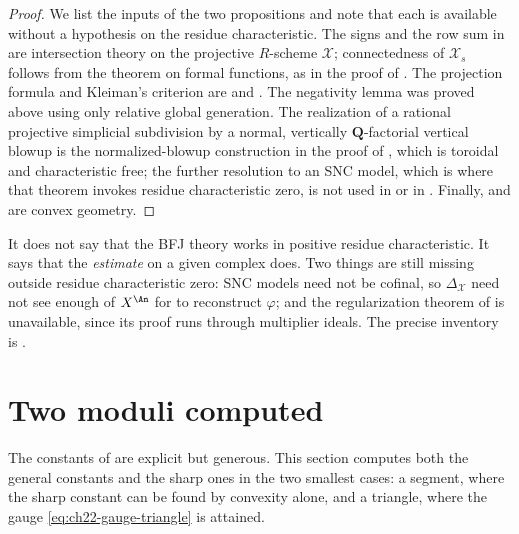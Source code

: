 \begin{proof}
We list the inputs of the two propositions and note that each is available
without a hypothesis on the residue characteristic.  The signs and the row
sum in  are intersection theory on the
projective $R$-scheme $\mathcal X$; connectedness of $\mathcal X_s$
follows from the theorem on formal functions, as in the proof of
.  The projection formula and Kleiman's criterion
are  and \cite[Section~1.4]{KM08}.  The negativity
lemma  was proved above using only relative global
generation.  The realization of a rational projective simplicial subdivision
by a normal, vertically $\mathbf Q$-factorial vertical blowup is the
normalized-blowup construction in the proof of
, which is toroidal and characteristic free;
the further resolution to an SNC model, which is where that theorem invokes
residue characteristic zero, is not used in
 or in
.  Finally,
 and  are convex geometry.
\end{proof}

\begin{remark}
\label{rem:ch22-characteristic-free-caveat}
It does not say that the BFJ theory works in positive residue
characteristic.  It says that the \emph{estimate} on a given complex does.
Two things are still missing outside residue characteristic zero: SNC models
need not be cofinal, so $\Delta_{\mathcal X}$ need not see enough of
$X^{\An}$ for  to reconstruct
$\varphi$; and the regularization theorem of
 is unavailable, since its proof runs through
multiplier ideals.  The precise inventory is
.
\end{remark}

\section{Two moduli computed}
\label{sec:ch22-worked-moduli}

The constants of 
are explicit but generous.  This section computes both the general constants
and the sharp ones in the two smallest cases: a segment, where the sharp
constant can be found by convexity alone, and a triangle, where the gauge
\eqref{eq:ch22-gauge-triangle} is attained.

